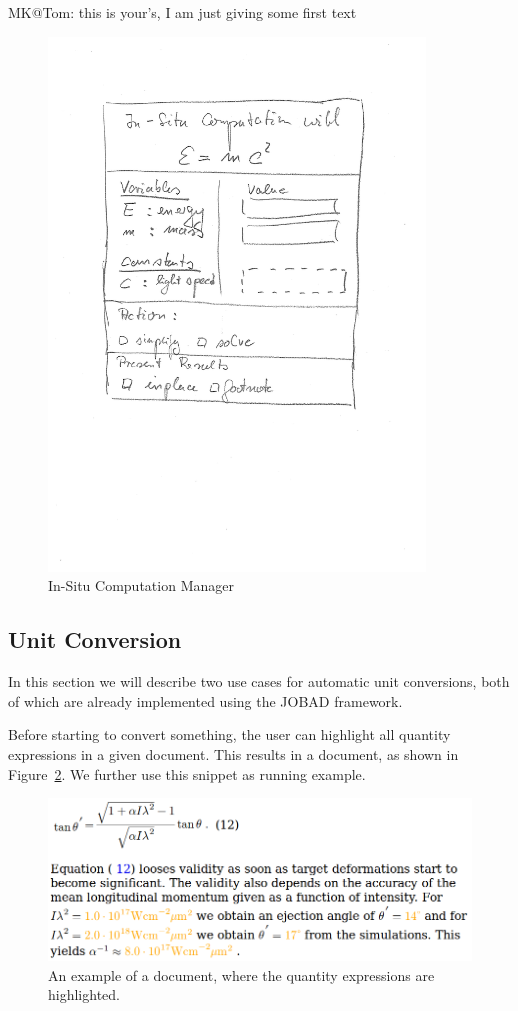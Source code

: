 \begin{newpart}{MK@Tom: this is your's, I am just giving some first text}
  \begin{figure}[ht]\centering
    \includegraphics[width=10cm]{compman}
    \caption{In-Situ Computation Manager}\label{fig:compman}
  \end{figure}

  
  \subsection{Unit Conversion}
In this section we will describe two use cases for automatic unit conversions, both of which
are already implemented using the JOBAD framework.

Before starting to convert something, the user can highlight all quantity
expressions in a given document. This results in a document, as shown in
Figure~\ref{fig:highlight}. We further use this snippet as running example.

\begin{figure}
\includegraphics[scale=0.3]{screenshots/highlight.png}
\caption{An example of a document, where the quantity expressions are highlighted.}
\label{fig:highlight}
\end{figure}


\end{newpart}
